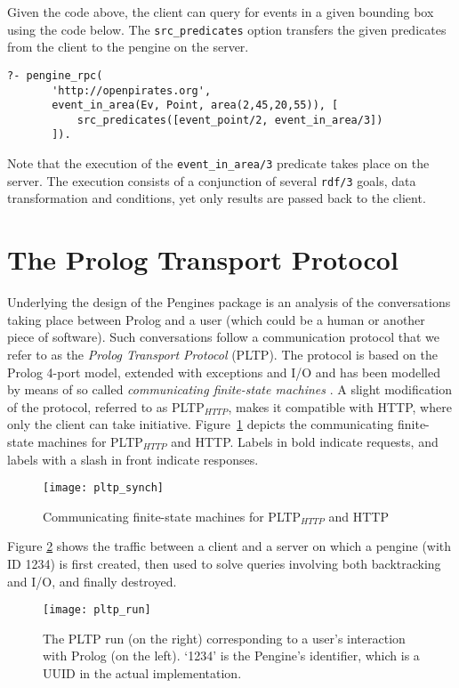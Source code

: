 \documentclass{new_tlp}
\newcommand{\reffont}{\tt}
\newcommand{\predref}[2]{\mbox{\reffont #1/#2}}
\newcommand{\Figref}[1]{Figure~\ref{fig:#1}}
\begin{document}
Given the code above, the client can query for events in a given
bounding box using the code below. The \texttt{src\_predicates}
option transfers the given predicates from the client to the pengine on
the server.

\begin{verbatim}
?- pengine_rpc(
       'http://openpirates.org',
       event_in_area(Ev, Point, area(2,45,20,55)), [
           src_predicates([event_point/2, event_in_area/3])
       ]).
\end{verbatim}

Note that the execution of the \predref{event\_in\_area}{3} predicate
takes place on the server.  The execution consists of a conjunction of
several \predref{rdf}{3} goals, data transformation and conditions, yet
only results are passed back to the client.
 

\section{The Prolog Transport Protocol}
\label{sec:PLTP}

Underlying the design of the Pengines package is an analysis of the
conversations taking place between Prolog and a user (which could be a
human or another piece of software). Such conversations follow a
communication protocol that we refer to as the \textit{Prolog Transport
Protocol} (PLTP). The protocol is based on the Prolog 4-port model,
\cite{byrd:80} extended with exceptions and I/O and has been modelled by
means of so called \emph{communicating finite-state machines}
\cite{brand1983communicating}. A slight modification of the protocol,
referred to as PLTP$_{HTTP}$, makes it compatible with HTTP, where only
the client can take initiative. \Figref{state-machine} depicts the
communicating finite-state machines for PLTP$_{HTTP}$ and HTTP. Labels
in bold indicate requests, and labels with a slash in front indicate
responses.


\begin{figure}[h]
	\texttt{[image: pltp\_synch]}
    \caption{Communicating finite-state machines for PLTP$_{HTTP}$ and HTTP}
    \label{fig:state-machine}
\end{figure}


Figure \ref{fig:run} shows the traffic between a client and a server on
which a pengine (with ID 1234) is first created, then used to solve
queries involving both backtracking and I/O, and finally destroyed.

\begin{figure}[h]
	\texttt{[image: pltp\_run]}
    \caption{The PLTP run (on the right) corresponding to a user's
    interaction with Prolog (on the left). `1234' is the Pengine's
    identifier, which is a UUID in the actual implementation.}
    \label{fig:run}
\end{figure}
\end{document}

